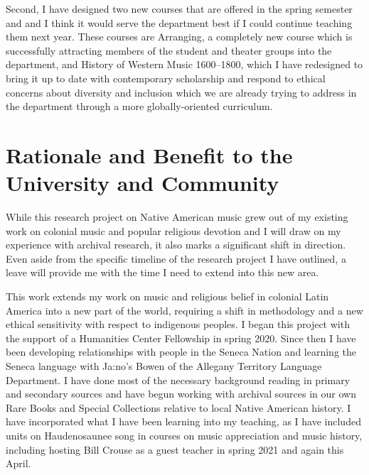 \documentclass[12pt]{article}
\begin{document}
Second, I have designed two new courses that are offered in the spring
semester and and I think it would serve the department best if I could
continue teaching them next year.
These courses are Arranging, a completely new course which is successfully
attracting members of the student  and theater groups into the
department, and History of Western Music 1600--1800, which I have redesigned
to bring it up to date with contemporary scholarship and respond to ethical
concerns about diversity and inclusion which we are already trying to address
in the department through a more globally-oriented curriculum.

\section{Rationale and Benefit to the University and Community}

While this research project on Native American music grew out of my existing
work on colonial music and popular religious devotion and I will draw on my
experience with archival research, it also marks a significant shift in
direction.
Even aside from the specific timeline of the research project I have outlined,
a leave will provide me with the time I need to extend into this new area.

This work extends my work on music and religious belief in colonial Latin
America into a new part of the world, requiring a shift in methodology and a
new ethical sensitivity with respect to indigenous peoples.%
\Autocites{Cashner:HearingFaith}{Cashner:Cards}{Cashner:ImitatingAfricans}
I began this project with the support of a Humanities Center Fellowship in
spring 2020. 
Since then I have been developing relationships with people in the Seneca
Nation and learning the Seneca language with Ja:no's Bowen of the Allegany
Territory Language Department.
I have done most of the necessary background reading in primary and secondary
sources and have begun working with archival sources in our own Rare Books and
Special Collections relative to local Native American history.
I have incorporated what I have been learning into my teaching, as I have
included units on Haudenosaunee song in courses on music appreciation and
music history, including hosting Bill Crouse as a guest teacher in spring 2021
and again this April.
\end{document}
